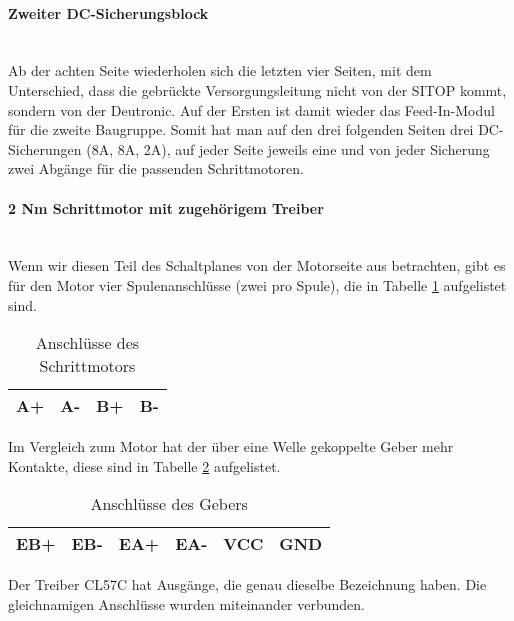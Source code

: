     \paragraph{Zweiter DC-Sicherungsblock}\mbox{}\\
    Ab der achten Seite wiederholen sich die letzten vier Seiten, mit dem Unterschied, dass die gebrückte Versorgungsleitung nicht von der SITOP kommt, sondern von der Deutronic. Auf der Ersten ist damit wieder das Feed-In-Modul für die zweite Baugruppe. Somit hat man auf den drei folgenden Seiten drei DC-Sicherungen (8A, 8A, 2A), auf jeder Seite jeweils eine und von jeder Sicherung zwei Abgänge für die passenden Schrittmotoren.
    \paragraph{2 Nm Schrittmotor mit zugehörigem Treiber}\mbox{}\\
    Wenn wir diesen Teil des Schaltplanes von der Motorseite aus betrachten, gibt es für den Motor vier Spulenanschlüsse (zwei pro Spule), die in Tabelle \ref{tab:motoranschluesse} aufgelistet sind.
    \begin{table}[H]
        \centering
        \begin{tabular}{|c|c|c|c|}
            \hline
            \textbf{A+} & \textbf{A-} & \textbf{B+} & \textbf{B-} \\ \hline
        \end{tabular}
        \caption{Anschlüsse des Schrittmotors}
        \label{tab:motoranschluesse}
    \end{table}
    Im Vergleich zum Motor hat der über eine Welle gekoppelte Geber mehr Kontakte, diese sind in Tabelle \ref{tab:geberanschluesse} aufgelistet.
    \begin{table}[H]
        \centering
        \begin{tabular}{|c|c|c|c|c|c|}
            \hline
            \textbf{EB+} & \textbf{EB-} & \textbf{EA+} & \textbf{EA-} & \textbf{VCC} & \textbf{GND} \\ \hline
        \end{tabular}
        \caption{Anschlüsse des Gebers}
        \label{tab:geberanschluesse}
    \end{table}
    Der Treiber CL57C hat Ausgänge, die genau dieselbe Bezeichnung haben. Die gleichnamigen Anschlüsse wurden miteinander verbunden. \\\\
